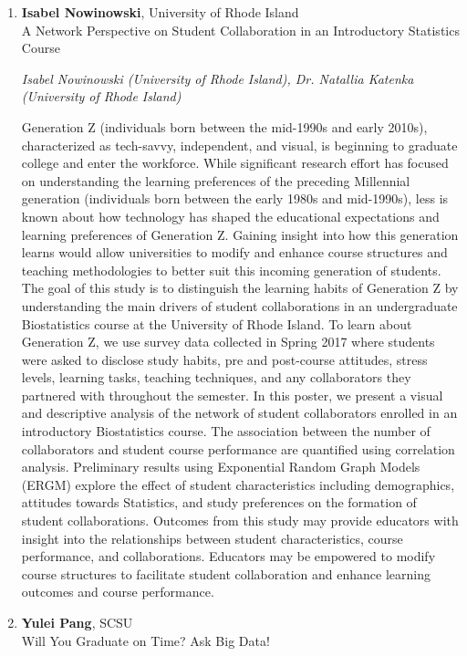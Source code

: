 \begin{enumerate}
\item \textbf{Isabel Nowinowski}, University of Rhode Island \\
A Network Perspective on Student Collaboration in an Introductory Statistics Course

\emph{\footnotesize Isabel Nowinowski (University of Rhode Island), Dr. Natallia Katenka (University of Rhode Island)}

Generation Z (individuals born between the mid-1990s and early 2010s), characterized as tech-savvy, independent, and visual, is beginning to graduate college and enter the workforce. While significant research effort has focused on understanding the learning preferences of the preceding Millennial generation (individuals born between the early 1980s and mid-1990s), less is known about how technology has shaped the educational expectations and learning preferences of Generation Z. Gaining insight into how this generation learns would allow universities to modify and enhance course structures and teaching methodologies to better suit this incoming generation of students. The goal of this study is to distinguish the learning habits of Generation Z by understanding the main drivers of student collaborations in an undergraduate Biostatistics course at the University of Rhode Island. To learn about Generation Z, we use survey data collected in Spring 2017 where students were asked to disclose study habits, pre and post-course attitudes, stress levels, learning tasks, teaching techniques, and any collaborators they partnered with throughout the semester. In this poster, we present a visual and descriptive analysis of the network of student collaborators enrolled in an introductory Biostatistics course. The association between the number of collaborators and student course performance are quantified using correlation analysis. Preliminary results using Exponential Random Graph Models (ERGM) explore the effect of student characteristics including demographics, attitudes towards Statistics, and study preferences on the formation of student collaborations. Outcomes from this study may provide educators with insight into the relationships between student characteristics, course performance, and collaborations. Educators may be empowered to modify course structures to facilitate student collaboration and enhance learning outcomes and course performance.

\item \textbf{Yulei Pang}, SCSU \\
Will You Graduate on Time? Ask Big Data!


\end{enumerate}
